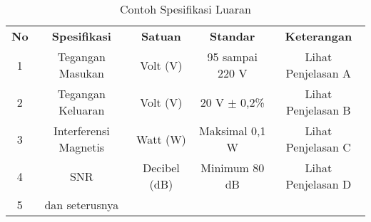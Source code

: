     \begin{longtable}{|c|c|c|c|c|}
        \caption{Contoh Spesifikasi Luaran} 
        \label{tab:Ch06_Contoh_Spesifikasi_Luaran}
        \vspace{-0.75em}\\
        \hline
        \textbf{No} & \textbf{Spesifikasi}  & \textbf{Satuan} & \textbf{Standar} & \textbf{Keterangan} \\ \hline
        1           & Tegangan Masukan      & Volt (V)        & 95 sampai 220 V  & Lihat Penjelasan A  \\ \hline
        2           & Tegangan Keluaran     & Volt (V)        & 20 V $\pm$ 0,2\% & Lihat Penjelasan B  \\ \hline
        3           & Interferensi Magnetis & Watt (W)        & Maksimal 0,1 W   & Lihat Penjelasan C  \\ \hline
        4           & SNR                   & Decibel (dB)    & Minimum 80 dB    & Lihat Penjelasan D  \\ \hline
        5           & dan seterusnya        &                 &                  &                     \\ \hline
    \end{longtable}
    
  